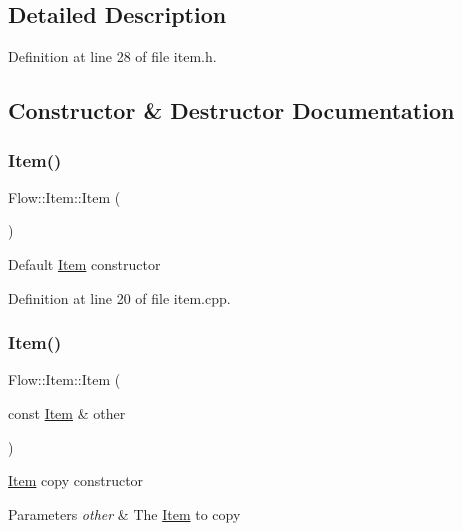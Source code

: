 \subsection{Detailed Description}


Definition at line 28 of file item.\+h.



\subsection{Constructor \& Destructor Documentation}
\hypertarget{class_flow_1_1_item_a5ceb9782e3bcecad6e897205555a2fd2}{}\label{class_flow_1_1_item_a5ceb9782e3bcecad6e897205555a2fd2} 
\subsubsection{\texorpdfstring{Item()}{Item()}\hspace{0.1cm}{\footnotesize\ttfamily [1/4]}}
{\footnotesize\ttfamily Flow\+::\+Item\+::\+Item (\begin{DoxyParamCaption}{ }\end{DoxyParamCaption})}

Default \hyperlink{class_flow_1_1_item}{Item} constructor 

Definition at line 20 of file item.\+cpp.

\hypertarget{class_flow_1_1_item_afd155cd633c9271deccc3a64a92ef8a6}{}\label{class_flow_1_1_item_afd155cd633c9271deccc3a64a92ef8a6} 
\subsubsection{\texorpdfstring{Item()}{Item()}\hspace{0.1cm}{\footnotesize\ttfamily [2/4]}}
{\footnotesize\ttfamily Flow\+::\+Item\+::\+Item (\begin{DoxyParamCaption}\item[{const \hyperlink{class_flow_1_1_item}{Item} \&}]{other }\end{DoxyParamCaption})}

\hyperlink{class_flow_1_1_item}{Item} copy constructor 
\begin{DoxyParams}{Parameters}
{\em other} & The \hyperlink{class_flow_1_1_item}{Item} to copy \\
\hline
\end{DoxyParams}


